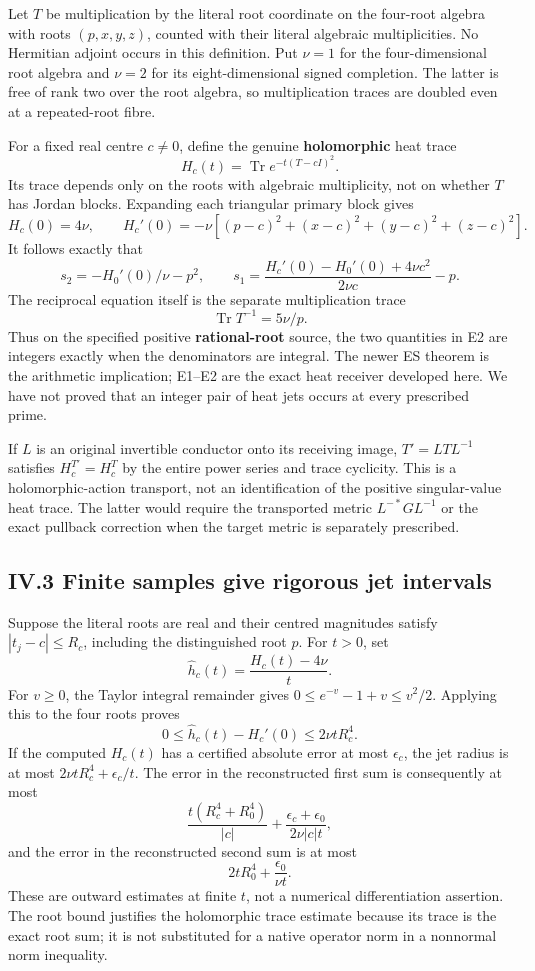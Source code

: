 Let \(T\) be multiplication by the literal root coordinate on the four-root algebra with roots \((p,x,y,z)\), counted with their literal algebraic multiplicities. No Hermitian adjoint occurs in this definition. Put \(\nu=1\) for the four-dimensional root algebra and \(\nu=2\) for its eight-dimensional signed completion. The latter is free of rank two over the root algebra, so multiplication traces are doubled even at a repeated-root fibre.

For a fixed real centre \(c\ne0\), define the genuine \textbf{holomorphic} heat trace \[
 H_c(t)=\operatorname{Tr}e^{-t(T-cI)^2}.
 \tag{E1}
\] Its trace depends only on the roots with algebraic multiplicity, not on whether \(T\) has Jordan blocks. Expanding each triangular primary block gives \[
 H_c(0)=4\nu,\qquad
 H_c'(0)=-\nu\left[(p-c)^2+(x-c)^2+(y-c)^2+(z-c)^2\right].
\] It follows exactly that \[
 \boxed{s_2=-H_0'(0)/\nu-p^2,\qquad
 s_1=\frac{H_c'(0)-H_0'(0)+4\nu c^2}{2\nu c}-p.}
 \tag{E2}
\] The reciprocal equation itself is the separate multiplication trace \[
 \operatorname{Tr}T^{-1}=5\nu/p.
 \tag{E3}
\] Thus on the specified positive \textbf{rational-root} source, the two quantities in E2 are integers exactly when the denominators are integral. The newer ES theorem is the arithmetic implication; E1--E2 are the exact heat receiver developed here. We have not proved that an integer pair of heat jets occurs at every prescribed prime.

If \(L\) is an original invertible conductor onto its receiving image, \(T'=LTL^{-1}\) satisfies \(H_c^{T'}=H_c^T\) by the entire power series and trace cyclicity. This is a holomorphic-action transport, not an identification of the positive singular-value heat trace. The latter would require the transported metric \(L^{-*}GL^{-1}\) or the exact pullback correction when the target metric is separately prescribed.

\subsection{IV.3 Finite samples give rigorous jet intervals}\label{iv.3-finite-samples-give-rigorous-jet-intervals}

Suppose the literal roots are real and their centred magnitudes satisfy \(|t_j-c|\le R_c\), including the distinguished root \(p\). For \(t>0\), set \[
 \widehat h_c(t)=\frac{H_c(t)-4\nu}{t}.
\] For \(v\ge0\), the Taylor integral remainder gives \(0\le e^{-v}-1+v\le v^2/2\). Applying this to the four roots proves \[
 \boxed{0\le\widehat h_c(t)-H_c'(0)\le2\nu tR_c^4.}
 \tag{E4}
\] If the computed \(H_c(t)\) has a certified absolute error at most \(\epsilon_c\), the jet radius is at most \(2\nu tR_c^4+\epsilon_c/t\). The error in the reconstructed first sum is consequently at most \[
 \boxed{\frac{t(R_c^4+R_0^4)}{|c|}
       +\frac{\epsilon_c+\epsilon_0}{2\nu|c|t},}
 \tag{E5}
\] and the error in the reconstructed second sum is at most \[
 \boxed{2tR_0^4+\frac{\epsilon_0}{\nu t}.}
 \tag{E6}
\] These are outward estimates at finite \(t\), not a numerical differentiation assertion. The root bound justifies the holomorphic trace estimate because its trace is the exact root sum; it is not substituted for a native operator norm in a nonnormal norm inequality.

